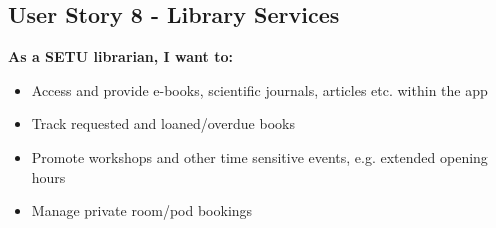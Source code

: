 \subsection*{User Story 8 - Library Services}
\textbf{As a SETU librarian, I want to:} 
\begin{itemize}
\item Access and provide e-books, scientific journals, articles etc. within the app
\item Track requested and loaned/overdue books
\item Promote workshops and other time sensitive events, e.g. extended opening hours
\item Manage private room/pod bookings
\end{itemize}

